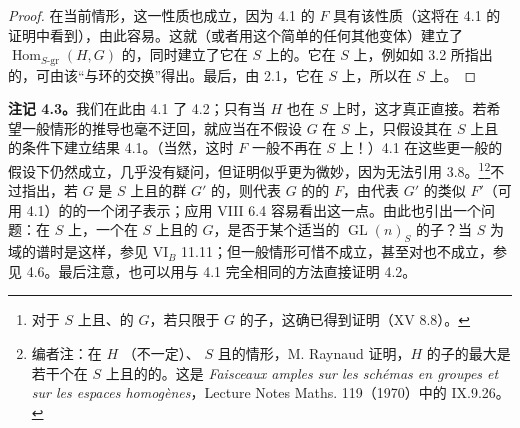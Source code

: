 \begin{proof}
在当前情形，这一性质也成立，因为 4.1 的 $F$ 具有该性质（这将在 4.1 的证明中看到），由此容易。这就（或者用这个简单的任何其他变体）建立了 $\operatorname{Hom}_{S\text{-gr}}(H,G)$ 的，同时建立了它在 $S$ 上的。它在 $S$ 上，例如如 3.2 所指出的，可由该“与环的交换”得出。最后，由 2.1，它在 $S$ 上，所以在 $S$ 上。
\end{proof}
\textbf{注记 4.3。}我们在此由 4.1 了 4.2；只有当 $H$ 也在 $S$ 上时，这才真正直接。若希望一般情形的推导也毫不迂回，就应当在不假设 $G$ 在 $S$ 上，只假设其在 $S$ 上且的条件下建立结果 4.1。（当然，这时 $F$ 一般不再在 $S$ 上！）4.1 在这些更一般的假设下仍然成立，几乎没有疑问，但证明似乎更为微妙，因为无法引用 3.8。\begingroup\renewcommand{\thefootnote}{\ensuremath{*}}\footnote{对于 $S$ 上且、的 $G$，若只限于 $G$ 的子，这确已得到证明（XV 8.8）。}\endgroup{}\footnote[4]{编者注：在 $H$ （不一定）、 $S$ 且的情形，M. Raynaud 证明，$H$ 的子的最大是若干个在 $S$ 上且的的。这是 \emph{Faisceaux amples sur les schémas en groupes et sur les espaces homogènes}，Lecture Notes Maths. 119（1970）中的 IX.9.26。}不过指出，若 $G$ 是 $S$ 上且的群 $G'$ 的，则代表 $G$ 的的 $F$，由代表 $G'$ 的类似 $F'$（可用 4.1）的的一个闭子表示；应用 VIII 6.4 容易看出这一点。由此也引出一个问题：在 $S$ 上，一个在 $S$ 上且的 $G$，是否于某个适当的 $\operatorname{GL}(n)_S$ 的子？当 $S$ 为域的谱时是这样，参见 VI$_B$ 11.11；但一般情形可惜不成立，甚至对也不成立，参见 4.6。最后注意，也可以用与 4.1 完全相同的方法直接证明 4.2。
